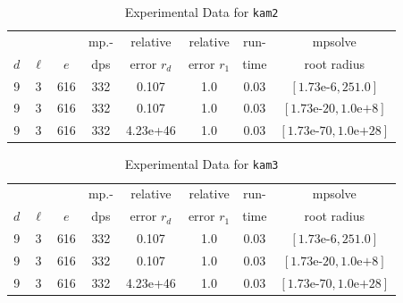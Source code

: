 \documentclass[runningheads]{llncs}
\begin{document}
\begin{table}
\caption{Experimental Data for \texttt{kam2}} %
\label{tab:kam2}
\vskip -0.15in
\begin{center}
\begin{small}
\begin{sc}
\begin{tabular}{rccccccc}
\toprule
&  &  & mp.-& relative  & relative & run- & mpsolve \\
$d$& $\ell$& $e$ & dps&error $r_d$       & error $r_1$ &time& root radius\\
\midrule
 9 & 3 & 616 & 332 & 0.107 & 1.0 & 0.03 & $[1.73\text{e-}6, 251.0]$\\
 9 & 3 & 616 & 332 & 0.107 & 1.0 & 0.03 & $[1.73\text{e-}20, 1.0\text{e+}8]$\\
 9 & 3 & 616 & 332 & 4.23e+46 & 1.0 & 0.03 & $[1.73\text{e-}70, 1.0\text{e+}28]$\\
\bottomrule
\end{tabular}
\end{sc}
\end{small}
\end{center}
\vskip 0.05in
\end{table}

\begin{table}
\caption{Experimental Data for \texttt{kam3}} %
\label{tab:kam3}
\vskip -0.15in
\begin{center}
\begin{small}
\begin{sc}
\begin{tabular}{rccccccc}
\toprule
&  &  & mp.-& relative  & relative & run- & mpsolve \\
$d$& $\ell$& $e$ & dps&error $r_d$       & error $r_1$ &time& root radius\\
\midrule
 9 & 3 & 616 & 332 & 0.107 & 1.0 & 0.03 & $[1.73\text{e-}6, 251.0]$\\
 9 & 3 & 616 & 332 & 0.107 & 1.0 & 0.03 & $[1.73\text{e-}20, 1.0\text{e+}8]$\\
 9 & 3 & 616 & 332 & 4.23e+46 & 1.0 & 0.03 & $[1.73\text{e-}70, 1.0\text{e+}28]$\\
\bottomrule
\end{tabular}
\end{sc}
\end{small}
\end{center}
\vskip 0.05in
\end{table}
\end{document}
